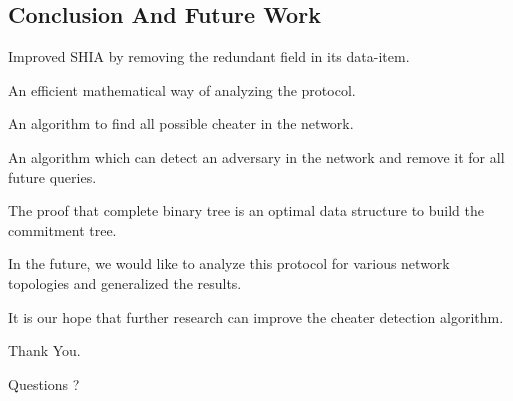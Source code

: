 \documentclass[%
  slidesonly,%
  semlayer%
  ]{seminar}                                  %
\begin{document}
\begin{slide}
    \subsection*{Conclusion And Future Work}
      \vfill
      Improved SHIA by removing the redundant field in its data-item.
      
      An efficient mathematical way of analyzing the protocol. 
      
      An algorithm to find all possible cheater in the network.
      
      An algorithm which can detect an adversary in the network and remove it for all future queries.
      
      The proof that complete binary tree is an optimal data structure to build the commitment tree.

      In the future, we would like to analyze this protocol for various network topologies and generalized the results.

      It is our hope that further research can improve the cheater detection algorithm.

      \vfill
      \clearpage
      \vfill
        \begin{center}
          \Huge 
          Thank You.  

          Questions ?
        \end{center}
      \clearpage

\end{slide}
\end{document}

